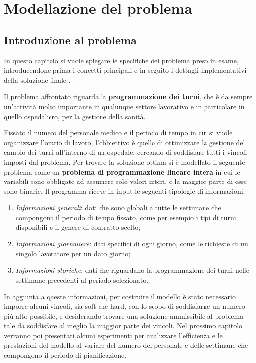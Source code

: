 \chapter{Modellazione del problema}\label{ch:chapter2}

\section{Introduzione al problema}
In questo capitolo si vuole spiegare le specifiche del problema preso in esame, introducendone prima i concetti principali e in seguito i dettagli implementativi della soluzione finale \cite{ref:article}.

Il problema affrontato riguarda la \textbf{programmazione dei turni}, che è da sempre un'attività molto importante in qualunque settore lavorativo e in particolare in quello ospedaliero, per la gestione della sanità.

Fissato il numero del personale medico e il periodo di tempo in cui si vuole organizzare l'orario di lavoro, l'obbiettivo è quello di ottimizzare la gestione del cambio dei turni all'interno di un ospedale, cercando di soddisfare tutti i vincoli imposti dal problema.
Per trovare la soluzione ottima si è modellato il seguente problema come un \textbf{problema di programmazione lineare intera} in cui le variabili sono obbligate ad assumere solo valori interi, e la maggior parte di esse sono binarie.
Il programma riceve in input le seguenti tipologie di informazioni:
\begin{enumerate}
\item \textit{Informazioni generali}: dati che sono globali a tutte le settimane che compongono il periodo di tempo fissato, come per esempio i tipi di turni disponibili o il genere di contratto scelto;
\item \textit{Informazioni giornaliere}: dati specifici di ogni giorno, come le richieste di un singolo lavoratore per un dato giorno;
\item \textit{Informazioni storiche}: dati che riguardano la programmazione dei turni nelle settimane precedenti al periodo selezionato.
\end{enumerate}

In aggiunta a queste informazioni, per costruire il modello è stato necessario imporre alcuni vincoli, sia soft che hard, con lo scopo di soddisfarne un numero più alto possibile, e desiderando trovare una soluzione ammissibile al problema tale da soddisfare al meglio la maggior parte dei vincoli.
Nel prossimo capitolo verranno poi presentati alcuni esperimenti per analizzare l'efficienza e le prestazioni del modello al variare del numero del personale e delle settimane che compongono il periodo di pianificazione.

